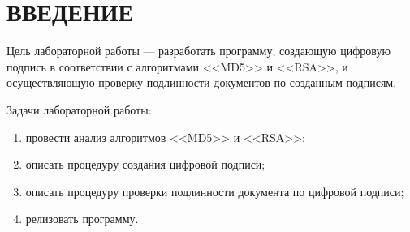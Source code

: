 \chapter*{ВВЕДЕНИЕ}

Цель лабораторной работы --- разработать программу, создающую цифровую подпись в соответствии с алгоритмами <<MD5>> и <<RSA>>, и осуществляющую проверку подлинности документов по созданным подписям.

Задачи лабораторной работы:

\begin{enumerate}
    \item провести анализ алгоритмов <<MD5>> и <<RSA>>;
    \item описать процедуру создания цифровой подписи;
    \item описать процедуру проверки подлинности документа по цифровой подписи;
    \item релизовать программу.
\end{enumerate}
